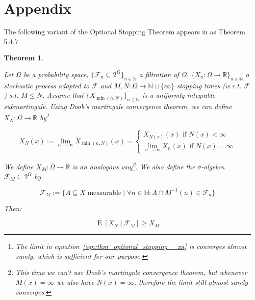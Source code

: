 \documentclass[11pt]{article}
\theoremstyle{definition}
\theoremstyle{plain}
\newtheorem{theorem}{Theorem}%
\newcommand{\Nats}{\mathbb{N}}
\newcommand{\Reals}{\mathbb{R}}
\newcommand{\Sq}[2]{\{#1\}_{#2 \in \Nats}}
\newcommand{\Sqn}[1]{\Sq{#1}{n}}
\DeclareMathOperator{\E}{E}
\newcommand{\F}{\mathcal{F}}
\begin{document}
\section{Appendix}

The following variant of the Optional Stopping Theorem appears in \cite{Durrett_2010} as Theorem 5.4.7.

\begin{samepage}
\begin{theorem}
\label{thm:optional_stopping}

Let ${\Omega}$ be a probability space, ${\Sqn{\F_n \subseteq 2^\Omega}}$ a filtration of ${\Omega}$, ${\Sqn{X_n: \Omega \rightarrow \Reals}}$ a stochastic process adapted to ${\F}$ and ${M,N: \Omega \rightarrow \Nats \sqcup \{\infty\}}$ stopping times (w.r.t. ${\F}$) s.t. ${M \leq N}$. Assume that ${\Sqn{X_{\min(n,N)}}}$ is a uniformly integrable submartingale. Using Doob's martingale convergence theorem, we can define ${X_N : \Omega \rightarrow \Reals}$ by\footnote{The limit in equation~\ref{eqn:thm_optional_stopping__xn} is converges \emph{almost} surely, which is sufficient for our purpose.}

\begin{equation}
\label{eqn:thm_optional_stopping__xn}
X_N(x):=\lim_{n \rightarrow \infty} X_{\min(n,N)}(x)=\begin{cases}X_{N(x)}(x) \text{ if } N(x) < \infty\\\lim_{n \rightarrow \infty} X_n(x) \text{ if } N(x) = \infty\end{cases}
\end{equation}

We define ${X_M: \Omega \rightarrow \Reals}$ is an analogous way\footnote{This time we can't use Doob's martingale convergence theorem, but whenever ${M(x) = \infty}$ we also have ${N(x) = \infty}$, therefore the limit still almost surely converges.}. We also define the $\sigma$-algebra ${\F_M \subseteq 2^\Omega}$ by

\begin{equation}
\F_M:=\{A \subseteq X \text{ measurable} \mid \forall n \in \Nats: A \cap M^{-1}(n) \in \F_n\}
\end{equation}

Then:

\begin{equation}
\E[X_N \mid \F_M] \geq X_M
\end{equation}

\end{theorem}
\end{samepage}
\end{document}

